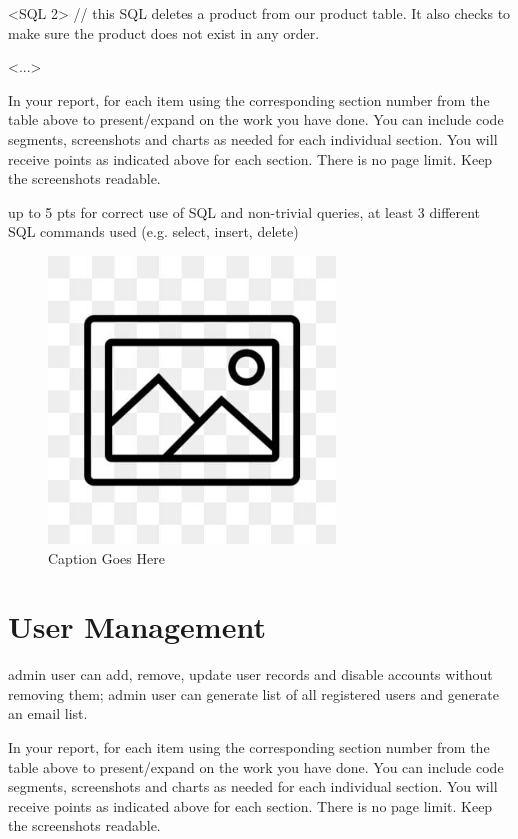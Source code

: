 \documentclass[12pt, letterpaper]{article}
\begin{document}
<SQL 2> // this SQL deletes a product from our product table. It also checks to make sure the product does not exist in any order.

<...>

In your report, for each item using the corresponding section number from the table above to present/expand on the work you have done. You can include code segments, screenshots and charts as needed for each individual section. You will receive points as indicated above for each section. There is no page limit. Keep the screenshots readable.

up to 5 pts for correct use of SQL and non-trivial queries, at least 3 different SQL commands used (e.g. select, insert, delete)

\begin{figure}[htbp]
	\centering
	\includegraphics[width=3in]{images/placeholder.jpg}
	\caption{Caption Goes Here}
 \end{figure}

 \newpage

\section{User Management}
admin user can add, remove, update user records and disable accounts without removing them; admin user can generate list of all registered users and generate an email list.

In your report, for each item using the corresponding section number from the table above to present/expand on the work you have done. You can include code segments, screenshots and charts as needed for each individual section. You will receive points as indicated above for each section. There is no page limit. Keep the screenshots readable.
\end{document}
